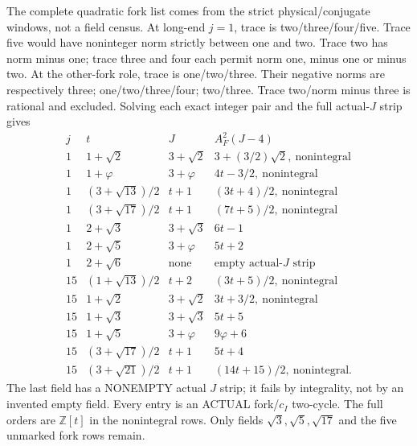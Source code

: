 The complete quadratic fork list comes
from the strict physical/conjugate
windows, not a field census.
At long-end \(j=1\), trace is
two/three/four/five.
Trace five would have noninteger norm
strictly between one and two.
Trace two has norm minus one;
trace three and four each permit
norm one, minus one or minus two.
At the other-fork role, trace is
one/two/three.
Their negative norms are respectively
three; one/two/three/four; two/three.
Trace two/norm minus three is rational
and excluded.
Solving each exact integer pair and
the full actual-\(J\) strip gives
\[
\begin{array}{c|c|c|l}
 j&t&J&A_F^2(J-4)\\ \hline
1&1+\sqrt2&3+\sqrt2&3+(3/2)\sqrt2,\ \text{nonintegral}\\
1&1+\varphi&3+\varphi&4t-3/2,\ \text{nonintegral}\\
1&(3+\sqrt{13})/2&t+1&(3t+4)/2,\ \text{nonintegral}\\
1&(3+\sqrt{17})/2&t+1&(7t+5)/2,\ \text{nonintegral}\\
1&2+\sqrt3&3+\sqrt3&6t-1\\
1&2+\sqrt5&3+\varphi&5t+2\\
1&2+\sqrt6&\text{none}&\text{empty actual-}J\text{ strip}\\
15&(1+\sqrt{13})/2&t+2&(3t+5)/2,\ \text{nonintegral}\\
15&1+\sqrt2&3+\sqrt2&3t+3/2,\ \text{nonintegral}\\
15&1+\sqrt3&3+\sqrt3&5t+5\\
15&1+\sqrt5&3+\varphi&9\varphi+6\\
15&(3+\sqrt{17})/2&t+1&5t+4\\
15&(3+\sqrt{21})/2&t+1&(14t+15)/2,\ \text{nonintegral}.
\end{array}
\]
The last field has a NONEMPTY actual
\(J\) strip; it fails by integrality,
not by an invented empty field.
Every entry is an ACTUAL fork/\(c_I\)
two-cycle.
The full orders are \(\mathbb Z[t]\)
in the nonintegral rows.
Only fields \(\sqrt3,\sqrt5,\sqrt{17}\)
and the five unmarked fork rows remain.

